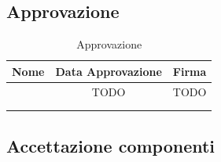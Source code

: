 \subsection{Approvazione}

\renewcommand{\arraystretch}{1}
	\begin{table}[H]
		\begin{center}
			\setlength{\aboverulesep}{0pt}
			\setlength{\belowrulesep}{0pt}
			\setlength{\extrarowheight}{.75ex}
			\begin{tabular}{ c c c}
				\rowcolor{AzzurroGruppo!30} 
				\textbf{Nome} & \textbf{Data Approvazione} & \textbf{Firma} \\
				\toprule
				
				\Francesco{} & TODO & TODO \\
				\Tullio{} & & \\
				\Riccardo{} & & \\
				
				\bottomrule
			\end{tabular}
			\caption{Approvazione}
		\end{center}
    \end{table}

\subsection{Accettazione componenti}


